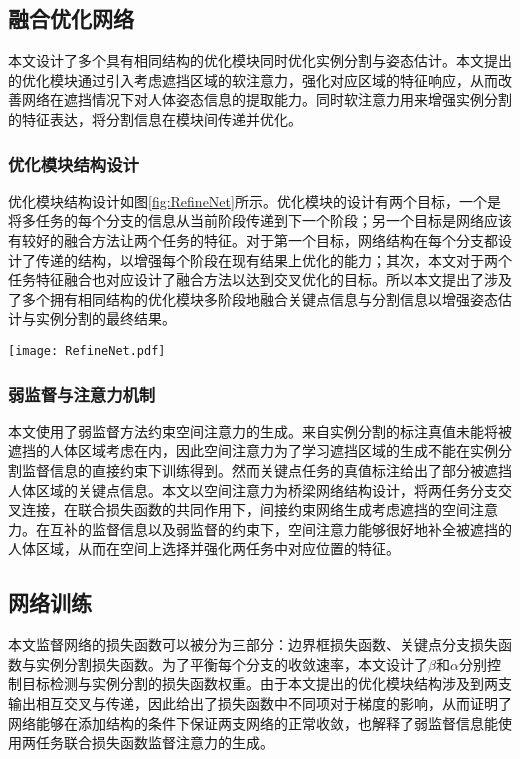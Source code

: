 \begin{outstandingabstract}
 	\subsection{融合优化网络}
 	本文设计了多个具有相同结构的优化模块同时优化实例分割与姿态估计。本文提出的优化模块通过引入考虑遮挡区域的软注意力，强化对应区域的特征响应，从而改善网络在遮挡情况下对人体姿态信息的提取能力。同时软注意力用来增强实例分割的特征表达，将分割信息在模块间传递并优化。
 	\subsubsection{优化模块结构设计}
 	优化模块结构设计如图\ref{fig:RefineNet}所示。优化模块的设计有两个目标，一个是将多任务的每个分支的信息从当前阶段传递到下一个阶段；另一个目标是网络应该有较好的融合方法让两个任务的特征。对于第一个目标，网络结构在每个分支都设计了传递的结构，以增强每个阶段在现有结果上优化的能力；其次，本文对于两个任务特征融合也对应设计了融合方法以达到交叉优化的目标。所以本文提出了涉及了多个拥有相同结构的优化模块多阶段地融合关键点信息与分割信息以增强姿态估计与实例分割的最终结果。
 	\begin{figure*}[h]	
 		\centering
 		\texttt{[image: RefineNet.pdf]}
 		\caption{融合优化网络具体设计}
 		\label{fig:RefineNet}
 	\end{figure*}
 
 	\subsubsection{弱监督与注意力机制}
 	本文使用了弱监督方法约束空间注意力的生成\cite{10.1093/nsr/nwx106}。来自实例分割的标注真值未能将被遮挡的人体区域考虑在内，因此空间注意力为了学习遮挡区域的生成不能在实例分割监督信息的直接约束下训练得到。然而关键点任务的真值标注给出了部分被遮挡人体区域的关键点信息。本文以空间注意力为桥梁网络结构设计，将两任务分支交叉连接，在联合损失函数的共同作用下，间接约束网络生成考虑遮挡的空间注意力。在互补的监督信息以及弱监督的约束下，空间注意力能够很好地补全被遮挡的人体区域，从而在空间上选择并强化两任务中对应位置的特征。
 	
 	\subsection{网络训练}
 	本文监督网络的损失函数可以被分为三部分：边界框损失函数、关键点分支损失函数与实例分割损失函数\footnotemark[1]。为了平衡每个分支的收敛速率，本文设计了$\beta$和$\alpha$分别控制目标检测与实例分割的损失函数权重\footnotemark[1]。由于本文提出的优化模块结构涉及到两支输出相互交叉与传递，因此给出了损失函数中不同项对于梯度的影响，从而证明了网络能够在添加结构的条件下保证两支网络的正常收敛\footnotemark[1]，也解释了弱监督信息能使用两任务联合损失函数监督注意力的生成。
 	

\end{outstandingabstract}
